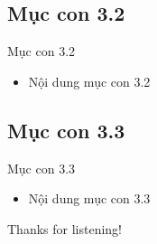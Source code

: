 \documentclass{beamer}
\begin{document}
\subsection{Mục con 3.2}
\begin{frame}{Mục con 3.2}
  \begin{itemize}
    \item Nội dung mục con 3.2
  \end{itemize}
\end{frame}

\subsection{Mục con 3.3}
\begin{frame}{Mục con 3.3}
  \begin{itemize}
    \item Nội dung mục con 3.3
  \end{itemize}
\end{frame}






\begin{frame}{}
  \centering
  \Huge{Thanks for listening!}
\end{frame}
\end{document}
